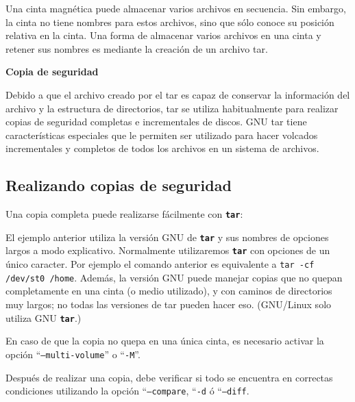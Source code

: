 \documentclass[12pt]{article}
\begin{document}
Una cinta magnética puede almacenar varios archivos en secuencia. Sin
 embargo, la cinta no tiene nombres para estos archivos, sino que sólo 
conoce su posición relativa en la cinta. Una forma de almacenar varios 
archivos en una cinta y retener sus nombres es mediante la creación de un 
archivo tar. 

{\bf Copia de seguridad}

Debido a que el archivo creado por el tar es capaz de conservar la 
información del archivo y la estructura de directorios, tar se utiliza 
habitualmente para realizar copias de seguridad completas e incrementales 
de discos. GNU tar tiene características especiales que le permiten ser
utilizado para hacer volcados incrementales y completos de todos los 
archivos en un sistema de archivos.

\subsection*{Realizando copias de seguridad}
Una copia completa puede realizarse fácilmente con \texttt{\textbf{tar}}:


El ejemplo anterior utiliza la versión GNU de \texttt{\textbf{tar}} y sus 
nombres de opciones largos a modo explicativo. Normalmente utilizaremos 
\texttt{\textbf{tar}} con opciones de un único caracter. Por ejemplo el 
comando anterior es equivalente a {\tt tar -cf /dev/st0 /home}. 
Además, la versión GNU puede manejar copias que no quepan completamente 
en una cinta (o medio utilizado), y con caminos de
directorios muy largos; no todas las versiones de tar pueden hacer eso. 
(GNU/Linux solo utiliza GNU \texttt{\textbf{tar}}.)  

En caso de que la copia no quepa en una única cinta, es necesario activar la
 opción ``{\tt --multi-volume}'' o ``{\tt -M}''. 

Después de realizar una copia, debe verificar si todo se encuentra en 
correctas condiciones utilizando la opción ``{\tt --compare}, ``{\tt -d} ó 
``{\tt --diff}. 
\end{document}
